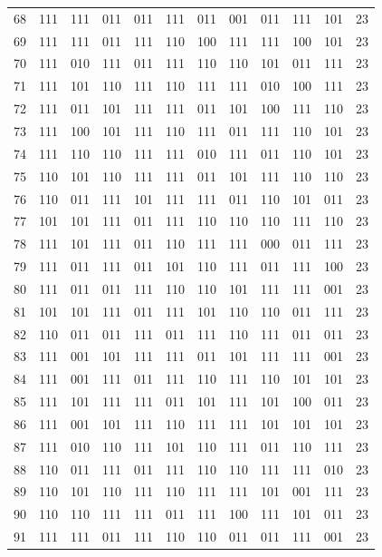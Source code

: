 \begin{longtable}{r*{10}{c}r}
68 & 111 & 111 & 011 & 011 & 111 & 011 & 001 & 011 & 111 & 101 & 23\\
69 & 111 & 111 & 011 & 111 & 110 & 100 & 111 & 111 & 100 & 101 & 23\\
70 & 111 & 010 & 111 & 011 & 111 & 110 & 110 & 101 & 011 & 111 & 23\\
71 & 111 & 101 & 110 & 111 & 110 & 111 & 111 & 010 & 100 & 111 & 23\\
72 & 111 & 011 & 101 & 111 & 111 & 011 & 101 & 100 & 111 & 110 & 23\\
73 & 111 & 100 & 101 & 111 & 110 & 111 & 011 & 111 & 110 & 101 & 23\\
74 & 111 & 110 & 110 & 111 & 111 & 010 & 111 & 011 & 110 & 101 & 23\\
75 & 110 & 101 & 110 & 111 & 111 & 011 & 101 & 111 & 110 & 110 & 23\\
76 & 110 & 011 & 111 & 101 & 111 & 111 & 011 & 110 & 101 & 011 & 23\\
77 & 101 & 101 & 111 & 011 & 111 & 110 & 110 & 110 & 111 & 110 & 23\\
78 & 111 & 101 & 111 & 011 & 110 & 111 & 111 & 000 & 011 & 111 & 23\\
79 & 111 & 011 & 111 & 011 & 101 & 110 & 111 & 011 & 111 & 100 & 23\\
80 & 111 & 011 & 011 & 111 & 110 & 110 & 101 & 111 & 111 & 001 & 23\\
81 & 101 & 101 & 111 & 011 & 111 & 101 & 110 & 110 & 011 & 111 & 23\\
82 & 110 & 011 & 011 & 111 & 011 & 111 & 110 & 111 & 011 & 011 & 23\\
83 & 111 & 001 & 101 & 111 & 111 & 011 & 101 & 111 & 111 & 001 & 23\\
84 & 111 & 001 & 111 & 011 & 111 & 110 & 111 & 110 & 101 & 101 & 23\\
85 & 111 & 101 & 111 & 111 & 011 & 101 & 111 & 101 & 100 & 011 & 23\\
86 & 111 & 001 & 101 & 111 & 110 & 111 & 111 & 101 & 101 & 101 & 23\\
87 & 111 & 010 & 110 & 111 & 101 & 110 & 111 & 011 & 110 & 111 & 23\\
88 & 110 & 011 & 111 & 011 & 111 & 110 & 110 & 111 & 111 & 010 & 23\\
89 & 110 & 101 & 110 & 111 & 110 & 111 & 111 & 101 & 001 & 111 & 23\\
90 & 110 & 110 & 111 & 111 & 011 & 111 & 100 & 111 & 101 & 011 & 23\\
91 & 111 & 111 & 011 & 111 & 110 & 110 & 011 & 011 & 111 & 001 & 23\\

\end{longtable}
